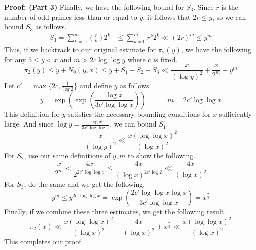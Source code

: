 \documentclass[8pt]{extarticle}
\begin{document}
\begin{boxedsection}
    \textbf{Proof: (Part 3)} Finally, we have the following bound for $S_3$. Since $r$ is the number of odd primes less than or equal to $y$, it follows that $2r \leq y$, so we can bound $S_3$ as follows.
    \begin{align*}
        S_3 = \sum_{k=0}^m {r \choose k} 2^k &\leq \sum_{k=0}^m r^k 2^k \ll (2r)^m \leq y^m
    \end{align*}
    Thus, if we backtrack to our original estimate for $\pi_2(y)$, we have the following for any $5 \leq y < x$ and $m > 2c \log \log y$ where $c$ is fixed.
    $$
    \pi_2(y) \leq y + N_0(y,x) \leq y + S_1 - S_2 + S_3 \ll \frac{x}{(\log y)^2} + \frac{x}{2^m} + y^m
    $$
    Let $c' = \max\{2c, \frac{1}{\log 2}\}$ and define $y$ as follows.
    $$
    y = \exp\left(\exp\left(\frac{\log x}{3c'\log \log x}\right)\right) \quad \quad \quad m = 2c' \log \log x
    $$
    This definition for $y$ satisfies the necessary bounding conditions for $x$ sufficiently large. And since $\log y = \frac{\log x}{3c' \log \log x}$, we can bound $S_1$.
    $$
    \frac{x}{(\log y)^2} \ll \frac{x (\log \log x)^2}{(\log x)^2}
    $$
    For $S_2$, use our same definitions of $y,m$ to show the following.
    $$
    \frac{x}{2^m} < \frac{4x}{2^{2c' \log \log x}} \leq \frac{4x}{(\log x)^{2c' \log 2}} \ll \frac{4x}{(\log x)^2}
    $$
    For $S_3$, do the same and we get the following.
    $$
    y^m \leq y^{2c' \log \log x} = \exp\left(\frac{2c' \log \log x \log x}{3c' \log \log x}\right) = x^{\frac{2}{3}}
    $$
    Finally, if we combine these three estimates, we get the following result.
    $$
    \pi_2(x) \ll  \frac{x (\log \log x)^2}{(\log x)^2} +  \frac{4x}{(\log x)^2} + x^{\frac{2}{3}} \ll \frac{x (\log \log x)^2}{(\log x)^2}
    $$
    This completes our proof.
\end{boxedsection}
\end{document}

